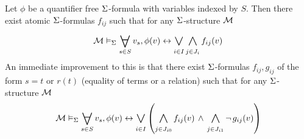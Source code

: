 \begin{lem}
    Let $\phi$ be a quantifier free $\Sigma$-formula with variables indexed
    by $S$.
    Then there exist atomic $\Sigma$-formulas
    $f_{ij}$ such that
    for any $\Sigma$-structure $\mathcal{M}$
    \[ 
        \MM \model{\Si} \bigforall{s \in S}{}v_s, \phi(v) 
        \IFF \bigor{i \in I}{} 
        \bigand{j \in J_{i}}{} f_{ij}(v)
    \]
    An immediate improvement to this is that there exist $\Sigma$-formulas
    $f_{ij}, g_{ij}$ of the form $s = t$ or $r(t)$ 
    (equality of terms or a relation) such that
    for any $\Sigma$-structure $\mathcal{M}$
    \[ 
        \MM \model{\Si} \bigforall{s \in S}{}v_s, \phi(v) 
        \IFF \bigor{i \in I}{} 
        \brkt{\bigand{j \in J_{i0}}{} f_{ij}(v)\AND 
        \bigand{j \in J_{i1}}{} \NOT g_{ij}(v)}
    \]
\end{lem}
